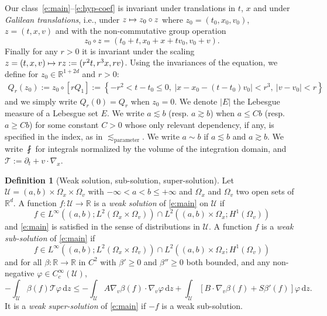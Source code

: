 \documentclass[11pt]{article}
\newcommand{\ie}{i.e.,\xspace}
\newcommand{\skpt}{\smallskip}
\numberwithin{equation}{section}\let\oldbigcup\bigcup
\let\mathcal\mathscr
\def\mto{\mathchoice{\longmapsto}{\mapsto}{\mapsto}{\mapsto}}
\theoremstyle{definition}
\newtheorem{definition}[theorem]{Definition}
\theoremstyle{remark}
\newcommand\R{{\mathbb R}}
\newcommand{\cU}{\mathcal{U}}
\newcommand{\cT}{\mathcal T}
\newcommand{\dd}{{\, \mathrm d}}
\begin{document}
Our class~\eqref{e:main}--\eqref{e:hyp-coef} is invariant under
translations in $t$, $x$ and under \emph{Galilean translations},
\ie under $z \mto z_0 \circ z$ where $z_0 =(t_0,x_0,v_0)$,
$z = (t,x,v)$ and with the non-commutative group operation
\begin{equation*}
z_0 \circ z = (t_0+t,x_0+x + t v_0, v_0 + v).
\end{equation*}
Finally for any $r>0$ it is invariant under the scaling
$z=(t,x,v) \mto rz := (r^2t,r^3x,r v)$. Using the invariances of
the equation, we define for $z_0 \in \R^{1+2d}$ and $r>0$:
\begin{align*}
Q_r(z_0) := z_0 \circ \left[ r Q_1 \right]
:= \left\{ -r^2 <t-t_0 \le 0, \ |x - x_0- (t-t_0)v_0|
< r^3, \ |v-v_0| < r \right\}
\end{align*}
and we simply write $Q_r(0)=Q_r$ when $z_0=0$. We denote $|E|$
the Lebesgue measure of a Lebesgue set $E$. We write
$a \lesssim b$ (resp. $a \gtrsim b$) when $a \le Cb$ (resp.
$a \ge Cb$) for some constant $C>0$ whose only relevant
dependency, if any, is specified in the index, as in
$\lesssim_{\text{parameter}}$. We write $a\sim b$ if
$a \lesssim b$ and $a \gtrsim b$. We write $\fint$ for integrals
normalized by the volume of the integration domain, and
$\cT:=\partial_t+v\cdot \nabla_x$.

\skpt
\begin{definition}[Weak solution, sub-solution, super-solution]
\label{d:weak}
Let $\cU = (a,b) \times \Omega_x \times \Omega_v$ with
$-\infty<a < b \le +\infty$ and $\Omega_x$ and $\Omega_v$ two
open sets of $\R^d$. A function $f: \cU \to \R$ is a \emph{weak
solution} of \eqref{e:main} on $\cU$ if
\[
f \in L^\infty ((a,b);L^2 (\Omega_x \times \Omega_v)) \cap L^2
((a,b) \times \Omega_x;H^1(\Omega_v))
\]
and \eqref{e:main} is
satisfied in the sense of distributions in $\cU$. A function
$f$ is a \emph{weak sub-solution} of \eqref{e:main} if
\[
f \in L^\infty ((a,b);L^2 (\Omega_x \times \Omega_v)) \cap L^2
((a,b) \times \Omega_x;H^1(\Omega_v))
\]
and for all
$\beta : \R \to \R$ in $C^2$ with $\beta' \ge 0$ and
$\beta'' \ge 0$ both bounded, and any non-negative
$\varphi \in C^\infty_c (\cU)$,
\begin{equation*}
- \int_\cU \beta(f) \cT \varphi \dd z
\le - \int_{\cU} A \nabla_v \beta(f) \cdot \nabla_v \varphi \dd
z + \int_{\cU} \left[ B \cdot \nabla_v \beta(f)+S \beta'(f)
\right] \varphi \dd z.
\end{equation*}
It is a \emph{weak super-solution} of \eqref{e:main} if $-f$ is
a weak sub-solution.
\end{definition}
\end{document}
